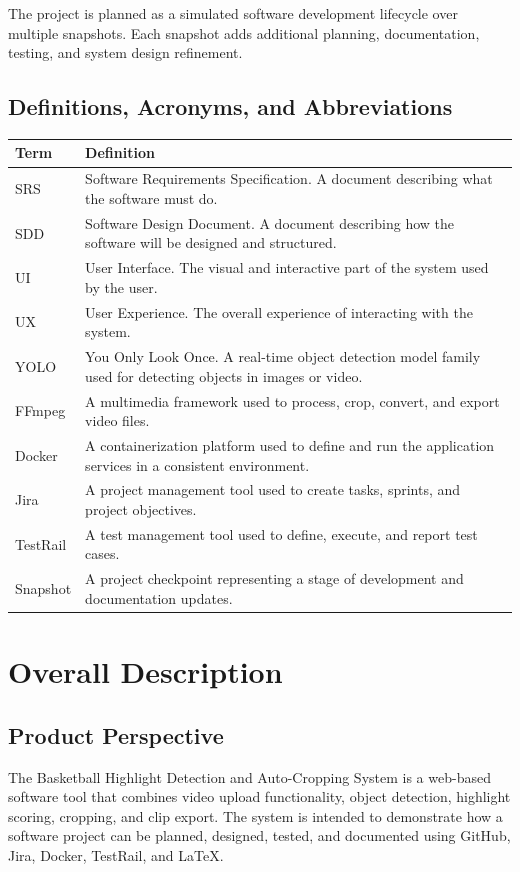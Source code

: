 \documentclass[12pt]{article}
\begin{document}
The project is planned as a simulated software development lifecycle over multiple snapshots. Each snapshot adds additional planning, documentation, testing, and system design refinement.

\subsection{Definitions, Acronyms, and Abbreviations}
\begin{longtable}{|p{1.5in}|p{4.5in}|}
\hline
\textbf{Term} & \textbf{Definition} \\
\hline
SRS & Software Requirements Specification. A document describing what the software must do. \\
\hline
SDD & Software Design Document. A document describing how the software will be designed and structured. \\
\hline
UI & User Interface. The visual and interactive part of the system used by the user. \\
\hline
UX & User Experience. The overall experience of interacting with the system. \\
\hline
YOLO & You Only Look Once. A real-time object detection model family used for detecting objects in images or video. \\
\hline
FFmpeg & A multimedia framework used to process, crop, convert, and export video files. \\
\hline
Docker & A containerization platform used to define and run the application services in a consistent environment. \\
\hline
Jira & A project management tool used to create tasks, sprints, and project objectives. \\
\hline
TestRail & A test management tool used to define, execute, and report test cases. \\
\hline
Snapshot & A project checkpoint representing a stage of development and documentation updates. \\
\hline
\end{longtable}

\newpage

\section{Overall Description}

\subsection{Product Perspective}
The Basketball Highlight Detection and Auto-Cropping System is a web-based software tool that combines video upload functionality, object detection, highlight scoring, cropping, and clip export. The system is intended to demonstrate how a software project can be planned, designed, tested, and documented using GitHub, Jira, Docker, TestRail, and LaTeX.
\end{document}
